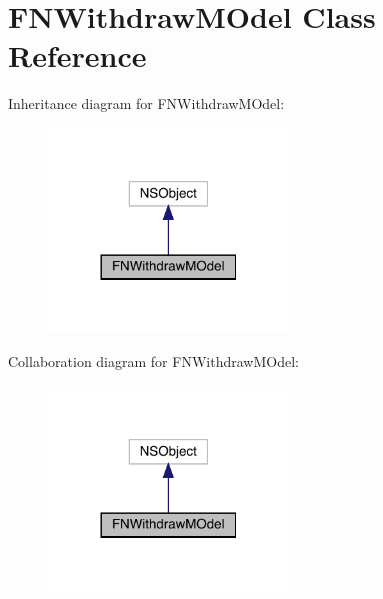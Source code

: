 \hypertarget{interface_f_n_withdraw_m_odel}{}\section{F\+N\+Withdraw\+M\+Odel Class Reference}
\label{interface_f_n_withdraw_m_odel}


Inheritance diagram for F\+N\+Withdraw\+M\+Odel\+:\nopagebreak
\begin{figure}[H]
\begin{center}
\leavevmode
\includegraphics[width=180pt]{interface_f_n_withdraw_m_odel__inherit__graph}
\end{center}
\end{figure}


Collaboration diagram for F\+N\+Withdraw\+M\+Odel\+:\nopagebreak
\begin{figure}[H]
\begin{center}
\leavevmode
\includegraphics[width=180pt]{interface_f_n_withdraw_m_odel__coll__graph}
\end{center}
\end{figure}
